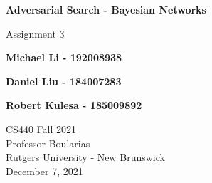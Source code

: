 \documentclass[11pt]{article}
\begin{document}
    \begin{titlepage}
        \begin{center}
            \vspace{1cm}

            \Huge
            \textbf{Adversarial Search - Bayesian Networks}

            \vspace{0.5cm}
            \LARGE
            Assignment 3

            \vspace{1cm}

            \textbf{Michael Li - 192008938}

            \textbf{Daniel Liu - 184007283}

            \textbf{Robert Kulesa - 185009892}


            \vfill


            \vspace{0.8cm}

            \Large
            CS440 Fall 2021\\
            Professor Boularias\\
            Rutgers University - New Brunswick\\
            December 7, 2021

        \end{center}
    \end{titlepage}
\end{document}
